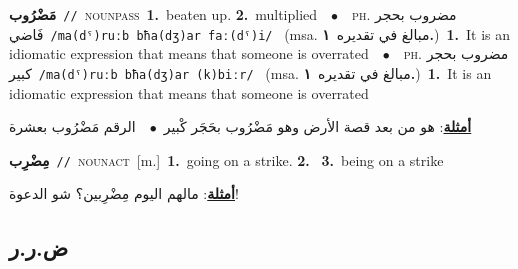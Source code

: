\documentclass[10pt,a4paper,twoside]{article} %
\begin{document}
\begin{multicols}{2}
{{{{{{{{{{{{\setlength\topsep{0pt}\textbf{\foreignlanguage{arabic}{مَضْرُوب}}\ {\color{gray}\texttt{//}\color{black}}\ \textsc{noun\textunderscore pass}\ \textbf{1.}~beaten up.  \textbf{2.}~multiplied\ \ $\bullet$\ \ \textsc{ph.} \color{gray} \foreignlanguage{arabic}{مضروب بحجر فَاضي}\color{black}\ {\color{gray}\texttt{/{\sffamily ma(dˤ)ruːb bħa(dʒ)ar faː(dˤ)i}/}\color{black}}\ \color{gray} (msa. \foreignlanguage{arabic}{مبالغ في تقديره}~\foreignlanguage{arabic}{\textbf{١.}})\color{black}\ \textbf{1.}~It is an idiomatic expression that means that someone is overrated\ \ $\bullet$\ \ \textsc{ph.} \color{gray} \foreignlanguage{arabic}{مضروب بحجر كبير}\color{black}\ {\color{gray}\texttt{/{\sffamily ma(dˤ)ruːb bħa(dʒ)ar (k)biːr}/}\color{black}}\ \color{gray} (msa. \foreignlanguage{arabic}{مبالغ في تقديره}~\foreignlanguage{arabic}{\textbf{١.}})\color{black}\ \textbf{1.}~It is an idiomatic expression that means that someone is overrated\  \begin{flushright}\color{gray}\foreignlanguage{arabic}{\textbf{\underline{\foreignlanguage{arabic}{أمثلة}}}: هو من بعد قصة الأرض وهو مَضْرُوب بحَجَر كْبير\ $\bullet$\ \  الرقم مَضْرُوب بعشرة}\end{flushright}\color{black}} \vspace{2mm}

{\setlength\topsep{0pt}\textbf{\foreignlanguage{arabic}{مِضْرِب}}\ {\color{gray}\texttt{//}\color{black}}\ \textsc{noun\textunderscore act}\ [m.]\ \textbf{1.}~going on a strike.  \textbf{2.}~  \textbf{3.}~being on a strike\  \begin{flushright}\color{gray}\foreignlanguage{arabic}{\textbf{\underline{\foreignlanguage{arabic}{أمثلة}}}: مالهم اليوم مِضْرِبين؟ شو الدعوة!}\end{flushright}\color{black}} \vspace{2mm}

\vspace{-3mm}
\subsection*{\color{blue}\foreignlanguage{arabic}{ض.ر.ر}\color{blue}{}} 

}}}}}}}}}}}
\end{multicols}
\end{document}

